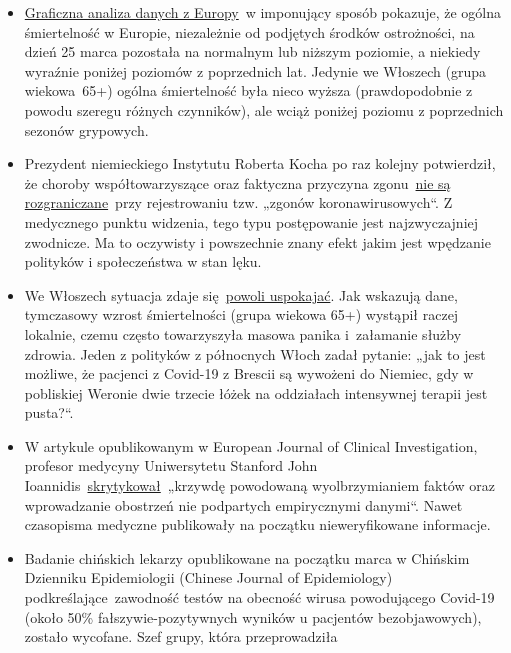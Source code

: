 \begin{itemize}
\tightlist
\item
  \href{https://off-guardian.org/2020/03/30/covid19-yet-to-impact-europes-overall-mortality/}{Graficzna
  analiza danych z Europy}~w imponujący sposób pokazuje, że ogólna
  śmiertelność w Europie, niezależnie od podjętych środków ostrożności,
  na dzień 25 marca pozostała na normalnym lub niższym poziomie, a
  niekiedy wyraźnie poniżej poziomów z poprzednich lat. Jedynie we
  Włoszech (grupa wiekowa~65+) ogólna śmiertelność była nieco wyższa
  (prawdopodobnie z powodu szeregu różnych czynników), ale wciąż poniżej
  poziomu z poprzednich sezonów grypowych.
\item
  Prezydent niemieckiego Instytutu Roberta Kocha po raz kolejny
  potwierdził, że choroby współtowarzyszące oraz faktyczna przyczyna
  zgonu~\href{https://swprs.org/rki-relativiert-corona-todesfaelle/}{nie
  są rozgraniczane}~przy rejestrowaniu tzw. „zgonów koronawirusowych``.
  Z medycznego punktu widzenia, tego typu postępowanie jest
  najzwyczajniej zwodnicze. Ma to oczywisty i powszechnie znany efekt
  jakim jest wpędzanie polityków i społeczeństwa w stan lęku.
\item
  We Włoszech sytuacja zdaje
  się~\href{https://www.tagesspiegel.de/politik/die-verlangsamung-ist-da-in-italien-zeichnet-sich-die-wende-in-der-coronakrise-ab/25698124.html}{powoli
  uspokajać}. Jak wskazują dane, tymczasowy wzrost śmiertelności (grupa
  wiekowa 65+) wystąpił raczej lokalnie, czemu często towarzyszyła
  masowa panika i~załamanie służby zdrowia. Jeden z polityków z
  północnych Włoch zadał pytanie: „jak to jest możliwe, że pacjenci z
  Covid-19 z Brescii są wywożeni do Niemiec, gdy w pobliskiej Weronie
  dwie trzecie łóżek na oddziałach intensywnej terapii jest pusta?``.
\item
  W artykule opublikowanym w European Journal of Clinical Investigation,
  profesor medycyny Uniwersytetu Stanford John
  Ioannidis~\href{https://onlinelibrary.wiley.com/doi/abs/10.1111/eci.13222}{skrytykował}~„krzywdę
  powodowaną wyolbrzymianiem faktów oraz wprowadzanie obostrzeń nie
  podpartych empirycznymi danymi``. Nawet czasopisma medyczne
  publikowały na początku nieweryfikowane informacje.
\item
  Badanie chińskich lekarzy opublikowane na początku marca w Chińskim
  Dzienniku Epidemiologii (Chinese Journal of Epidemiology)
  podkreślające~zawodność testów na obecność wirusa powodującego
  Covid-19 (około 50\% fałszywie-pozytywnych wyników u pacjentów
  bezobjawowych), zostało wycofane. Szef grupy, która przeprowadziła

\end{itemize}

